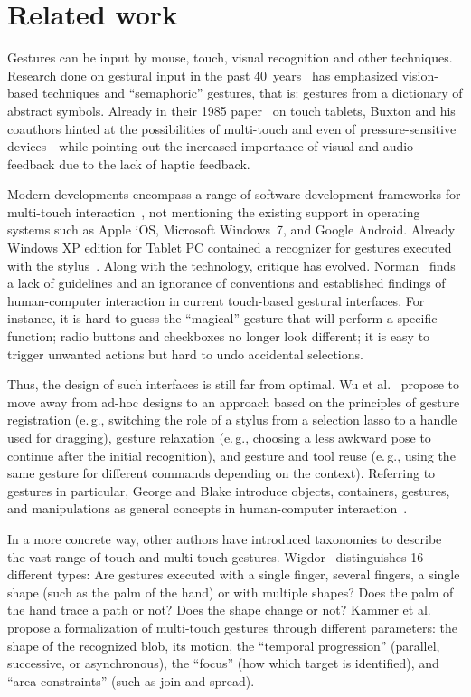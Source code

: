 \documentclass{aes130}
\begin{document}
\section{Related work}\label{related}

Gestures can be input by mouse, touch, visual recognition and other techniques. Research done on gestural input in the past 40~years~\cite{ecs11149} has emphasized vision-based techniques and ``semaphoric'' gestures, that is: gestures from a dictionary of abstract symbols. Already in their 1985 paper~\cite{Buxton:1985:ITT:325165.325239} on touch tablets, Buxton and his coauthors hinted at the possibilities of multi-touch and even of pressure-sensitive devices---while pointing out the increased importance of visual and audio feedback due to the lack of haptic feedback.

Modern developments encompass a range of software development frameworks for multi-touch interaction~\cite{frameworks}, not mentioning the existing support in operating systems such as Apple iOS, Microsoft Windows~7, and Google Android. Already Windows XP edition for Tablet PC contained a recognizer for gestures executed with the stylus~\cite{xp}. Along with the technology, critique has evolved. Norman~\cite{Norman:2010:GIS:1836216.1836228} finds a lack of guidelines and an ignorance of conventions and established findings of human-computer interaction in current touch-based gestural interfaces. For instance, it is hard to guess the ``magical'' gesture that will perform a specific function; radio buttons and checkboxes no longer look different; it is easy to trigger unwanted actions but hard to undo accidental selections.

Thus, the design of such interfaces is still far from optimal. Wu et al.~\cite{Wu:2006:GRR:1109723.1110635} propose to move away from ad-hoc designs to an approach based on the principles of gesture registration (e.\,g., switching the role of a stylus from a selection lasso to a handle used for dragging), gesture relaxation (e.\,g., choosing a less awkward pose to continue after the initial recognition), and gesture and tool reuse (e.\,g., using the same gesture for different commands depending on the context). Referring to gestures in particular, George and Blake introduce objects, containers, gestures, and manipulations as general concepts in human-computer interaction~\cite{ocgm}.

In a more concrete way, other authors have introduced taxonomies to describe the vast range of touch and multi-touch gestures. Wigdor~\cite{Wigdor:2010:ANU:1842993.1842997} distinguishes 16 different types: Are gestures executed with a single finger, several fingers, a single shape (such as the palm of the hand) or with multiple shapes? Does the palm of the hand trace a path or not? Does the shape change or not? Kammer et al.~\cite{Kammer:2010:TFM:1936652.1936662} propose a formalization of multi-touch gestures through different parameters: the shape of the recognized blob, its motion, the ``temporal progression'' (parallel, successive, or asynchronous), the ``focus'' (how which target is identified), and ``area constraints'' (such as join and spread).
\end{document}
